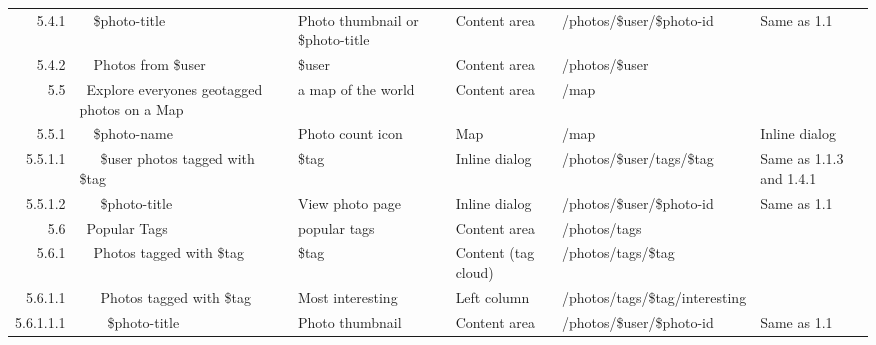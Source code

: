 \documentclass[12pt,a4paper]{article}
\begin{document}
\begin{landscape}
\begin{table}[h!b!p!]
\begin{center}
\begin{tiny}
\begin{tabular}{r|l|l|l|l|p{3cm}}
                5.4.1 &
                ~~\$photo-title &
                Photo thumbnail or \$photo-title &
                Content area &
                /photos/\$user/\$photo-id &
                Same as 1.1 \\

                5.4.2 &
                ~~Photos from \$user &
                \$user &
                Content area &
                /photos/\$user &
                \\

              5.5 &
              ~Explore everyones geotagged photos on a Map &
              a map of the world &
              Content area &
              /map &
              \\

                5.5.1 &
                ~~\$photo-name &
                Photo count icon &
                Map &
                /map &
                Inline dialog\\

                  5.5.1.1 &
                  ~~~\$user photos tagged with \$tag &
                  \$tag &
                  Inline dialog &
                  /photos/\$user/tags/\$tag &
                  Same as 1.1.3 and 1.4.1\\

                  5.5.1.2 &
                  ~~~\$photo-title &
                  View photo page &
                  Inline dialog &
                  /photos/\$user/\$photo-id &
                  Same as 1.1 \\

              5.6 &
              ~Popular Tags &
              popular tags &
              Content area &
              /photos/tags &
              \\

                5.6.1 &
                ~~Photos tagged with \$tag &
                \$tag &
                Content (tag cloud) &
                /photos/tags/\$tag &
                \\

                  5.6.1.1 &
                  ~~~Photos tagged with \$tag &
                  Most interesting &
                  Left column &
                  /photos/tags/\$tag/interesting &
                  \\

                    5.6.1.1.1 &
                    ~~~~\$photo-title &
                    Photo thumbnail &
                    Content area &
                    /photos/\$user/\$photo-id &
                    Same as 1.1 \\


\end{tabular}
\end{tiny}
\end{center}
\end{table}
\end{landscape}
\end{document}
